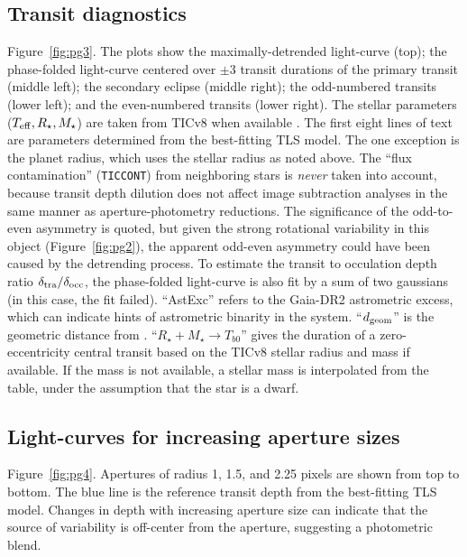 \documentclass[12pt,twocolumn,tighten]{aastex62}
\begin{document}
\subsection{Transit diagnostics}
\label{sec:pg3}

Figure~\ref{fig:pg3}.
The plots show the maximally-detrended light-curve (top); the
phase-folded light-curve centered over $\pm3$ transit durations of the
primary transit (middle left); the secondary eclipse (middle right);
the odd-numbered transits (lower left); and the even-numbered transits
(lower right).  The stellar parameters ($T_{\rm eff}, R_\star,
M_\star$) are taken from TICv8 when available
\citep{stassun_TIC8_2019}.
The first eight lines of text are parameters determined from the
best-fitting TLS model.  The one exception is the planet radius, which
uses the stellar radius as noted above.  The ``flux contamination''
(\texttt{TICCONT}) from neighboring stars is {\it never} taken into
account, because transit depth dilution does not affect image
subtraction analyses in the same manner as aperture-photometry
reductions.  The significance of the odd-to-even asymmetry is quoted,
but given the strong rotational variability in this object
(Figure~\ref{fig:pg2}), the apparent odd-even asymmetry could have
been caused by the detrending process.  To estimate the transit to
occulation depth ratio $\delta_{\rm tra}/\delta_{\rm occ}$, the
phase-folded light-curve is also fit by a sum of two gaussians (in
this case, the fit failed).  ``AstExc'' refers to the Gaia-DR2
astrometric excess, which can indicate hints of astrometric binarity
in the system.  ``$d_{\rm geom}$'' is the geometric distance from
\citet{bailer-jones_distances_2018}.  ``$R_\star + M_\star \rightarrow
T_{b0}$'' gives the duration of a zero-eccentricity central transit
based on the TICv8 stellar radius and mass if available. If the mass
is not available, a stellar mass is interpolated from the
\citet{pecaut_intrinsic_2013} table, under the assumption that the
star is a dwarf.

\subsection{Light-curves for increasing aperture sizes}
\label{sec:pg4}

Figure~\ref{fig:pg4}.
Apertures of radius 1, 1.5, and 2.25 pixels are shown from top to
bottom.  The blue line is the reference transit depth from the
best-fitting TLS model.  Changes in depth with increasing aperture
size can indicate that the source of variability is off-center from
the aperture, suggesting a photometric blend.
\end{document}

